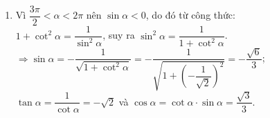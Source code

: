 \begin{bt}
{\begin{enumerate}
		$1+\tan^2\alpha=\dfrac{1}{\cos^2\alpha}$, suy ra $\cos^2\alpha=\dfrac{1}{1+\tan^2\alpha}$.\\
		$\Rightarrow\cos\alpha=-\dfrac{1}{\sqrt{1+\tan^2\alpha}}=-\dfrac{1}{\sqrt{1+(\sqrt{5})^2}}=-\dfrac{\sqrt{6}}{6}$;\\ $\cot\alpha=\dfrac{1}{\tan\alpha}=\dfrac{\sqrt{5}}{5}$ và $\sin\alpha=\tan\alpha\cdot\cos\alpha=-\dfrac{\sqrt{30}}{6}$.
		\item 
		Vì $\dfrac{3\pi}{2}<\alpha<2\pi$ nên $\sin\alpha<0$, do đó từ công thức:\\
		$1+\cot^2\alpha=\dfrac{1}{\sin^2\alpha}$, suy ra $\sin^2\alpha=\dfrac{1}{1+\cot^2\alpha}$.\\
		$\Rightarrow\sin\alpha=-\dfrac{1}{\sqrt{1+\cot^2\alpha}}=-\dfrac{1}{\sqrt{1+\left(-\dfrac{1}{\sqrt{2}}\right)^2}}=-\dfrac{\sqrt{6}}{3}$;\\ $\tan\alpha=\dfrac{1}{\cot\alpha}=-\sqrt{2}$ và $\cos\alpha=\cot\alpha\cdot\sin\alpha=\dfrac{\sqrt{3}}{3}$.
		\end{enumerate}
	}
\end{bt}

